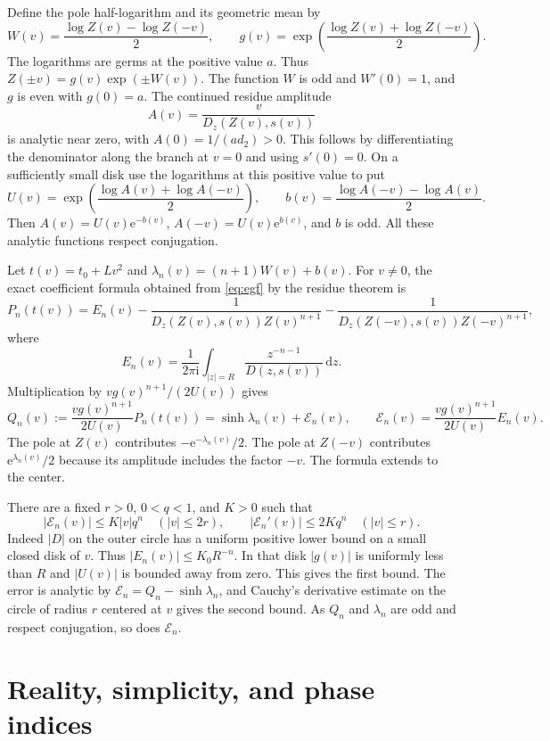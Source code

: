 \documentclass[11pt]{article}
\newcommand{\ee}{\mathrm e}
\newcommand{\ii}{\mathrm i}
\newcommand{\dd}{\,\mathrm d}
\begin{document}
Define the pole half-logarithm and its geometric mean by
\[
 W(v)=\frac{\log Z(v)-\log Z(-v)}2,\qquad
 g(v)=\exp\!\left(\frac{\log Z(v)+\log Z(-v)}2\right).
\]
The logarithms are germs at the positive value $a$. Thus
$Z(\pm v)=g(v)\exp(\pm W(v))$. The function $W$ is odd and
$W'(0)=1$, and $g$ is even with $g(0)=a$.
The continued residue amplitude
\[
 A(v)=\frac{v}{D_z(Z(v),s(v))}
\]
is analytic near zero, with $A(0)=1/(a d_2)>0$. This follows by
differentiating the denominator along the branch at $v=0$ and
using $s'(0)=0$. On a sufficiently small disk use the logarithms
at this positive value to put
\[
 U(v)=\exp\!\left(\frac{\log A(v)+\log A(-v)}2\right),\qquad
 b(v)=\frac{\log A(-v)-\log A(v)}2.
\]
Then $A(v)=U(v)\ee^{-b(v)}$, $A(-v)=U(v)\ee^{b(v)}$,
and $b$ is odd. All these analytic functions respect conjugation.

Let $t(v)=t_0+Lv^2$ and $\lambda_n(v)=(n+1)W(v)+b(v)$.
For $v\ne0$, the exact coefficient formula obtained from \eqref{eq:egf}
by the residue theorem \cite[Chap.~IV]{fs} is
\[
 P_n(t(v))=E_n(v)
 -\frac{1}{D_z(Z(v),s(v))Z(v)^{n+1}}
 -\frac{1}{D_z(Z(-v),s(v))Z(-v)^{n+1}},
\]
where
\[
 E_n(v)=\frac1{2\pi\ii}\int_{|z|=R}\frac{z^{-n-1}}{D(z,s(v))}\dd z .
\]
Multiplication by $v g(v)^{n+1}/(2U(v))$ gives
\begin{equation}\label{eq:wave}
 Q_n(v):=\frac{v g(v)^{n+1}}{2U(v)}P_n(t(v))
      =\sinh\lambda_n(v)+\mathcal E_n(v),\qquad
 \mathcal E_n(v)=\frac{v g(v)^{n+1}}{2U(v)}E_n(v).
\end{equation}
The pole at $Z(v)$ contributes $-\ee^{-\lambda_n(v)}/2$.
The pole at $Z(-v)$ contributes $\ee^{\lambda_n(v)}/2$ because its
amplitude includes the factor $-v$. The formula extends to the center.

There are a fixed $r>0$, $0<q<1$, and $K>0$ such that
\begin{equation}\label{eq:exp}
 |\mathcal E_n(v)|\le K|v|q^n\quad(|v|\le2r),\qquad
 |\mathcal E_n'(v)|\le 2Kq^n\quad(|v|\le r).
\end{equation}
Indeed $|D|$ on the outer circle has a uniform positive lower bound
on a small closed disk of $v$. Thus $|E_n(v)|\le K_0 R^{-n}$.
In that disk $|g(v)|$ is uniformly less than $R$ and $|U(v)|$
is bounded away from zero. This gives the first bound. The
error is analytic by $\mathcal E_n=Q_n-\sinh\lambda_n$, and
Cauchy's derivative estimate on the circle of radius $r$ centered
at $v$ gives the second bound. As $Q_n$ and $\lambda_n$ are odd
and respect conjugation, so does $\mathcal E_n$.

\section{Reality, simplicity, and phase indices}
\end{document}
